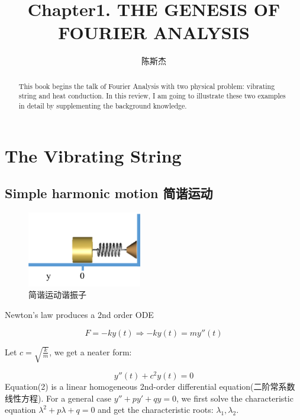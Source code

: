 \documentclass[UTF8,10pt,a4paper]{ctexart}
\author{陈斯杰}
\title{Chapter1. THE GENESIS OF FOURIER ANALYSIS}
\begin{document}
\maketitle
\begin{abstract}
This book begins the talk of Fourier Analysis with two 
physical problem: vibrating string and heat conduction.
In this review, I am going to illustrate these two examples
in detail by supplementing the background knowledge.
\end{abstract}

\section{The Vibrating String}
	\subsection{Simple harmonic motion 简谐运动}
		\begin{figure}[ht]
			\centering
			\includegraphics[width=5cm]{idealspring.png}
			\caption{简谐运动谐振子}
			\label{fig:simple_harmonic}
		\end{figure}
		
		\noindent
		Newton's law produces a 2nd order ODE

		\begin{equation}
			F=-ky(t) \Rightarrow -ky(t)=my''(t)
		\end{equation}

		Let $c=\sqrt{\frac{k}{m}}$, we get a neater form: 
		
		\begin{equation}
			y''(t)+c^2y(t)=0
		\end{equation}				
		\noindent
		Equation(2)	is a linear homogeneous 2nd-order differential equation(二阶常系数线性方程).
		For a general case $y''+py'+qy=0$, we first solve the characteristic equation
		$\lambda^2+p\lambda+q=0$ and get the characteristic roots: $\lambda_1, \lambda_2$.
		
\end{document}
